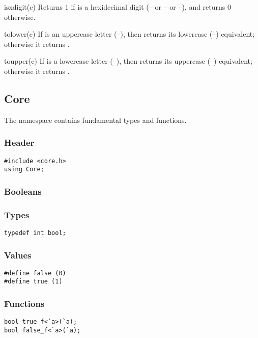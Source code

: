 \begin{defun}{isxdigit}{(c)}
Returns 1 if  is a hexidecimal digit (-- or
-- or --), and returns 0
otherwise.
\end{defun}

\begin{defun}{tolower}{(c)}
If  is an uppercase letter (--), then
 returns its lowercase (--)
equivalent; otherwise it returns .
\end{defun}

\begin{defun}{toupper}{(c)}
If  is a lowercase letter (--), then
 returns its uppercase
(--) equivalent; otherwise it returns .
\end{defun}

\subsection{Core}

The  namespace contains fundamental types and functions.

\subsubsection*{Header}
\begin{verbatim}
#include <core.h>
using Core;
\end{verbatim}

\subsubsection*{Booleans}
\subsubsection*{Types}
\begin{verbatim}
typedef int bool;
\end{verbatim}

\subsubsection*{Values}
\begin{verbatim}
#define false (0)
#define true (1)
\end{verbatim}

\subsubsection*{Functions}
\begin{verbatim}
bool true_f<`a>(`a);
bool false_f<`a>(`a);
\end{verbatim}


